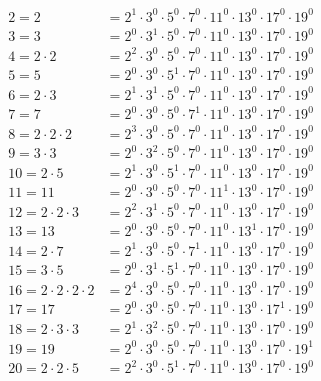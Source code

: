 \documentclass{article}
\begin{document}
\[\begin{aligned}
    2 = 2 &= 2^1 \cdot 3^0 \cdot 5^0 \cdot 7^0 \cdot 11^0 \cdot 13^0 \cdot 17^0 \cdot 19^0 \\
    3 = 3 &= 2^0 \cdot 3^1 \cdot 5^0 \cdot 7^0 \cdot 11^0 \cdot 13^0 \cdot 17^0 \cdot 19^0 \\
    4 = 2 \cdot 2 &= 2^2 \cdot 3^0 \cdot 5^0 \cdot 7^0 \cdot 11^0 \cdot 13^0 \cdot 17^0 \cdot 19^0 \\
    5 = 5 &= 2^0 \cdot 3^0 \cdot 5^1 \cdot 7^0 \cdot 11^0 \cdot 13^0 \cdot 17^0 \cdot 19^0 \\
    6 = 2 \cdot 3 &= 2^1 \cdot 3^1 \cdot 5^0 \cdot 7^0 \cdot 11^0 \cdot 13^0 \cdot 17^0 \cdot 19^0 \\
    7 = 7 &= 2^0 \cdot 3^0 \cdot 5^0 \cdot 7^1 \cdot 11^0 \cdot 13^0 \cdot 17^0 \cdot 19^0 \\
    8 = 2 \cdot 2 \cdot 2 &= 2^3 \cdot 3^0 \cdot 5^0 \cdot 7^0 \cdot 11^0 \cdot 13^0 \cdot 17^0 \cdot 19^0 \\
    9 = 3 \cdot 3 &= 2^0 \cdot 3^2 \cdot 5^0 \cdot 7^0 \cdot 11^0 \cdot 13^0 \cdot 17^0 \cdot 19^0 \\
    10 = 2 \cdot 5 &= 2^1 \cdot 3^0 \cdot 5^1 \cdot 7^0 \cdot 11^0 \cdot 13^0 \cdot 17^0 \cdot 19^0 \\
    11 = 11 &= 2^0 \cdot 3^0 \cdot 5^0 \cdot 7^0 \cdot 11^1 \cdot 13^0 \cdot 17^0 \cdot 19^0 \\
    12 = 2 \cdot 2 \cdot 3 &= 2^2 \cdot 3^1 \cdot 5^0 \cdot 7^0 \cdot 11^0 \cdot 13^0 \cdot 17^0 \cdot 19^0 \\
    13 = 13 &= 2^0 \cdot 3^0 \cdot 5^0 \cdot 7^0 \cdot 11^0 \cdot 13^1 \cdot 17^0 \cdot 19^0 \\
    14 = 2 \cdot 7 &= 2^1 \cdot 3^0 \cdot 5^0 \cdot 7^1 \cdot 11^0 \cdot 13^0 \cdot 17^0 \cdot 19^0 \\
    15 = 3 \cdot 5 &= 2^0 \cdot 3^1 \cdot 5^1 \cdot 7^0 \cdot 11^0 \cdot 13^0 \cdot 17^0 \cdot 19^0 \\
    16 = 2 \cdot 2 \cdot 2 \cdot 2 &= 2^4 \cdot 3^0 \cdot 5^0 \cdot 7^0 \cdot 11^0 \cdot 13^0 \cdot 17^0 \cdot 19^0 \\
    17 = 17 &= 2^0 \cdot 3^0 \cdot 5^0 \cdot 7^0 \cdot 11^0 \cdot 13^0 \cdot 17^1 \cdot 19^0 \\
    18 = 2 \cdot 3 \cdot 3 &= 2^1 \cdot 3^2 \cdot 5^0 \cdot 7^0 \cdot 11^0 \cdot 13^0 \cdot 17^0 \cdot 19^0 \\
    19 = 19 &= 2^0 \cdot 3^0 \cdot 5^0 \cdot 7^0 \cdot 11^0 \cdot 13^0 \cdot 17^0 \cdot 19^1 \\
    20 = 2 \cdot 2 \cdot 5 &= 2^2 \cdot 3^0 \cdot 5^1 \cdot 7^0 \cdot 11^0 \cdot 13^0 \cdot 17^0 \cdot 19^0
\end{aligned}\]
\end{document}
